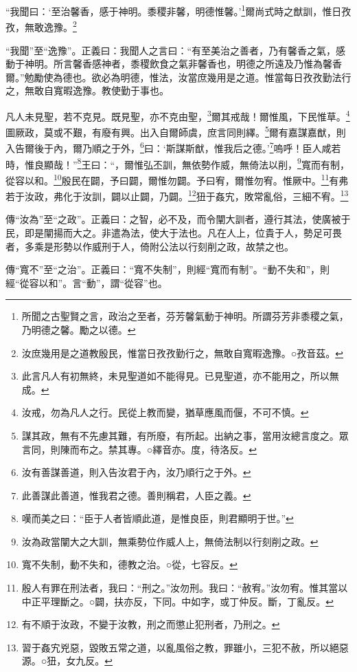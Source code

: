 “我聞曰：‘至治馨香，感于神明。黍稷非馨，明德惟馨。’\footnote{所聞之古聖賢之言，政治之至者，芬芳馨氣動于神明。所謂芬芳非黍稷之氣，乃明德之馨。勵之以德。}爾尚式時之猷訓，惟日孜孜，無敢逸豫。\footnote{汝庶幾用是之道教殷民，惟當日孜孜勤行之，無敢自寬暇逸豫。○孜音茲。}

{\noindent\shu{}\fzkt “我聞”至“逸豫”。正義曰：我聞人之言曰：“有至美治之善者，乃有馨香之氣，感動于神明。所言馨香感神者，黍稷飲食之氣非馨香也，明德之所遠及乃惟為馨香爾。”勉勵使為德也。欲必為明德，惟法，汝當庶幾用是之道。惟當每日孜孜勤法行之，無敢自寬暇逸豫。教使勤于事也。 \par}

凡人未見聖，若不克見。既見聖，亦不克由聖，\footnote{此言凡人有初無終，未見聖道如不能得見。已見聖道，亦不能用之，所以無成。}爾其戒哉！爾惟風，下民惟草。\footnote{汝戒，勿為凡人之行。民從上教而變，猶草應風而偃，不可不慎。}圖厥政，莫或不艱，有廢有興。出入自爾師虞，庶言同則繹。\footnote{謀其政，無有不先慮其難，有所廢，有所起。出納之事，當用汝總言度之。眾言同，則陳而布之。禁其專。○繹音亦。度，待洛反。}爾有嘉謀嘉猷，則入告爾後于內，爾乃順之于外，\footnote{汝有善謀善道，則入告汝君于內，汝乃順行之于外。}曰：‘斯謀斯猷，惟我后之德。’\footnote{此善謀此善道，惟我君之德。善則稱君，人臣之義。}嗚呼！臣人咸若時，惟良顯哉！”\footnote{嘆而美之曰：“臣于人者皆順此道，是惟良臣，則君顯明于世。”}王曰：“，爾惟弘丕訓，無依勢作威，無倚法以削，\footnote{汝為政當闡大之大訓，無乘勢位作威人上，無倚法制以行刻削之政。}寬而有制，從容以和。\footnote{寬不失制，動不失和，德教之治。○從，七容反。}殷民在闢，予曰闢，爾惟勿闢。予曰宥，爾惟勿宥。惟厥中。\footnote{殷人有罪在刑法者，我曰：“刑之。”汝勿刑。我曰：“赦宥。”汝勿宥。惟其當以中正平理斷之。○闢，扶亦反，下同。中如字，或丁仲反。斷，丁亂反。}有弗若于汝政，弗化于汝訓，闢以止闢，乃闢。\footnote{有不順于汝政，不變于汝教，刑之而懲止犯刑者，乃刑之。}狃于姦宄，敗常亂俗，三細不宥。\footnote{習于姦宄兇惡，毀敗五常之道，以亂風俗之教，罪雖小，三犯不赦，所以絕惡源。○狃，女九反。}


{\noindent\zhuan{}\fzbyks 傳“汝為”至“之政”。正義曰：之智，必不及，而令闡大訓者，遵行其法，使廣被于民，即是闡揚而大之。非遣為法，使大于法也。凡在人上，位貴于人，勢足可畏者，多乘是形勢以作威刑于人，倚附公法以行刻削之政，故禁之也。 \par}

{\noindent\zhuan{}\fzbyks 傳“寬不”至“之治”。正義曰：“寬不失制”，則經“寬而有制”。“動不失和”，則經“從容以和”。言“動”，謂“從容”也。 \par}

